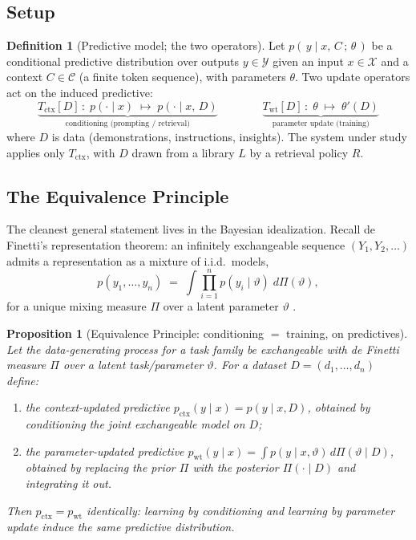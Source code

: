 \documentclass[11pt]{article}
\theoremstyle{plain}
\newtheorem{proposition}[theorem]{Proposition}
\theoremstyle{definition}
\newtheorem{definition}[theorem]{Definition}
\theoremstyle{remark}
\newcommand{\cC}{\mathcal{C}}
\newcommand{\cY}{\mathcal{Y}}
\newcommand{\cX}{\mathcal{X}}
\newcommand{\post}{\Pi}
\begin{document}
\subsection{Setup}

\begin{definition}[Predictive model; the two operators]\label{def:operators}
Let $p(\,y \mid x,\, C\,;\, \theta\,)$ be a conditional predictive
distribution over outputs $y \in \cY$ given an input $x \in \cX$ and a
context $C \in \cC$ (a finite token sequence), with parameters $\theta$.
Two update operators act on the induced predictive:
\[
  \underbrace{T_{\mathrm{ctx}}[D]\,:\; p(\cdot \mid x) \;\longmapsto\;
  p(\cdot \mid x,\, D)}_{\text{conditioning (prompting / retrieval)}}
  \qquad\qquad
  \underbrace{T_{\mathrm{wt}}[D]\,:\; \theta \;\longmapsto\;
  \theta'(D)}_{\text{parameter update (training)}}
\]
where $D$ is data (demonstrations, instructions, insights). The system under
study applies only $T_{\mathrm{ctx}}$, with $D$ drawn from a library $L$ by a
retrieval policy $R$.
\end{definition}

\subsection{The Equivalence Principle}

The cleanest general statement lives in the Bayesian idealization. Recall de
Finetti's representation theorem: an infinitely exchangeable sequence
$(Y_1, Y_2, \dots)$ admits a representation as a mixture of i.i.d.\ models,
\[
  p(y_1, \dots, y_n) \;=\; \int \prod_{i=1}^{n} p(y_i \mid \vartheta)\;
  d\post(\vartheta),
\]
for a unique mixing measure $\post$ over a latent parameter $\vartheta$
\cite{definetti,bernardosmith}.

\begin{proposition}[Equivalence Principle: conditioning $=$ training, on
predictives]\label{prop:definetti}
Let the data-generating process for a task family be exchangeable with de
Finetti measure $\post$ over a latent task/parameter $\vartheta$. For a
dataset $D = (d_1, \dots, d_n)$ define:
\begin{enumerate}[label=(\roman*),leftmargin=2.5em]
  \item the \emph{context-updated} predictive
        $p_{\mathrm{ctx}}(y \mid x) = p(y \mid x, D)$, obtained by
        conditioning the joint exchangeable model on $D$;
  \item the \emph{parameter-updated} predictive
        $p_{\mathrm{wt}}(y \mid x) = \int p(y \mid x, \vartheta)\,
        d\post(\vartheta \mid D)$, obtained by replacing the prior $\post$
        with the posterior $\post(\cdot \mid D)$ and integrating it out.
\end{enumerate}
Then $p_{\mathrm{ctx}} = p_{\mathrm{wt}}$ identically: \emph{learning by
conditioning and learning by parameter update induce the same predictive
distribution.}
\end{proposition}
\end{document}
